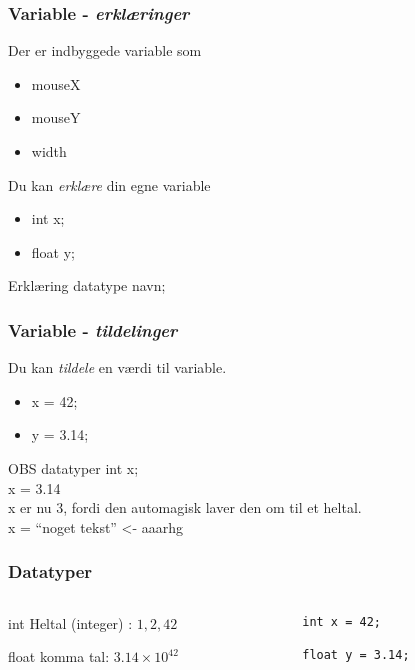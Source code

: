 \documentclass{beamer}
\begin{document}
\begin{frame}
  \frametitle{Variable - \emph{erklæringer}}
  
  Der er indbyggede variable som
  \begin{itemize}
  \item mouseX
  \item mouseY
  \item width
  \end{itemize}

  Du kan \emph{erklære} din egne variable
  \begin{itemize}
  \item int x;
  \item float y;
  \end{itemize}

  \begin{block}{Erklæring}
    datatype navn;
  \end{block}

\end{frame}

\begin{frame}
  \frametitle{Variable - \emph{tildelinger}}
  
  Du kan \emph{tildele} en værdi til variable.
  \begin{itemize}
  \item x = 42;
  \item y = 3.14;
  \end{itemize}


  \begin{block}{OBS datatyper}
    int x; \\
    x = 3.14 \\
    x er nu 3, fordi den automagisk laver den om til et heltal. \\
    x = ``noget tekst'' <- aaarhg
  \end{block}

\end{frame}



\begin{frame}[fragile]
  \frametitle{Datatyper}
  \begin{columns}
    \begin{column}{0.4\textwidth}
      \begin{block}{int}
        Heltal (integer) : $1,2,42$
      \end{block}
      \begin{block}{float}
        komma tal: $3.14 \times 10^{42}$
      \end{block}

    \end{column}
    \begin{column}{0.6\textwidth}    
\begin{verbatim}
int x = 42;

float y = 3.14;
\end{verbatim}

    \end{column}
  \end{columns}  
\end{frame}
\end{document}

